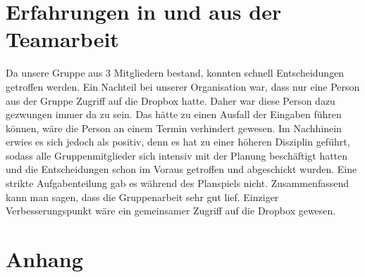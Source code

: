 \documentclass[a4paper, 12pt]{report}
\begin{document}
\begin{flushleft}
\chapter{Erfahrungen in und aus der Teamarbeit}
Da unsere Gruppe aus 3 Mitgliedern bestand, konnten schnell Entscheidungen getroffen werden. 
Ein Nachteil bei unserer Organisation war, dass nur eine Person aus der Gruppe Zugriff auf die Dropbox hatte.
Daher war diese Person dazu gezwungen immer da zu sein.
Das hätte zu einen Ausfall der Eingaben führen können, wäre die Person an einem Termin verhindert gewesen.
Im Nachhinein erwies es sich jedoch als positiv, denn es hat zu einer höheren Disziplin geführt, sodass alle Gruppenmitglieder sich intensiv mit der Planung beschäftigt hatten und die Entscheidungen schon im Voraus getroffen und abgeschickt wurden.
Eine strikte Aufgabenteilung gab es während des Planspiels nicht.
Zusammenfassend kann man sagen, dass die Gruppenarbeit sehr gut lief.
Einziger Verbesserungspunkt wäre ein gemeinsamer Zugriff auf die Dropbox gewesen. 

\chapter{Anhang}
%
%


%
 
%
%
%
%
%
%
%
%


\end{flushleft}
\end{document}
